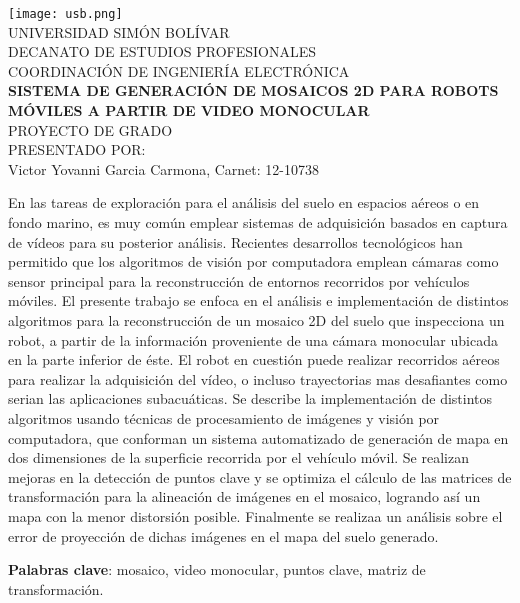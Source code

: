 \begin{titlepage}
    \begin{center}

        \texttt{[image: usb.png]} \\
        \textsc {\large UNIVERSIDAD SIMÓN BOLÍVAR} \\
        \textsc{DECANATO DE ESTUDIOS PROFESIONALES\\
        COORDINACIÓN DE INGENIERÍA ELECTRÓNICA}\\
        \textbf{SISTEMA DE GENERACIÓN DE MOSAICOS 2D PARA ROBOTS MÓVILES A PARTIR DE VIDEO MONOCULAR} \\
        PROYECTO DE GRADO \\
        PRESENTADO POR: \\
        Victor Yovanni Garcia Carmona, Carnet: 12-10738

    \end{center}
\abstract
{
    En las tareas de exploración para el análisis del suelo en espacios aéreos o en fondo marino, es muy común emplear sistemas de adquisición basados en captura de vídeos para su posterior análisis. Recientes desarrollos tecnológicos han permitido que los algoritmos de visión por computadora emplean cámaras como sensor principal para la reconstrucción de entornos recorridos por vehículos móviles. El presente trabajo se enfoca en el análisis e implementación de distintos algoritmos para la reconstrucción de un mosaico 2D del suelo que inspecciona un robot, a partir de la información proveniente de una cámara monocular ubicada en la parte inferior de éste. El robot en cuestión puede realizar recorridos aéreos para realizar la adquisición del vídeo, o incluso trayectorias mas desafiantes como serian las aplicaciones subacuáticas. Se describe la implementación de distintos algoritmos usando técnicas de procesamiento de imágenes y visión por computadora, que conforman un sistema automatizado de generación de mapa en dos dimensiones de la superficie recorrida por el vehículo móvil. Se realizan mejoras en la detección de puntos clave y se optimiza el cálculo de las matrices de transformación para la alineación de imágenes en el mosaico, logrando así un mapa con la menor distorsión posible. Finalmente se realizaa un análisis sobre el error de proyección de dichas imágenes en el mapa del suelo generado.
    
}

\noindent \begin{small} \textbf{Palabras clave}: mosaico, video monocular, puntos clave, matriz de transformación. 
\end{small}
	
\clearpage
{}

\end{titlepage}
